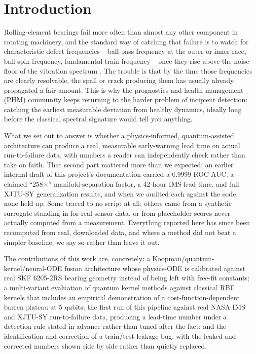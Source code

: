 \documentclass[3p,times,procedia]{elsarticle}
\begin{document}
\section{Introduction}

Rolling-element bearings fail more often than almost any other component in rotating machinery, and the standard way of catching that failure is to watch for characteristic defect frequencies -- ball-pass frequency at the outer or inner race, ball-spin frequency, fundamental train frequency -- once they rise above the noise floor of the vibration spectrum \cite{antoni2006}. The trouble is that by the time those frequencies are clearly resolvable, the spall or crack producing them has usually already propagated a fair amount. This is why the prognostics and health management (PHM) community keeps returning to the harder problem of incipient detection: catching the earliest measurable deviation from healthy dynamics, ideally long before the classical spectral signature would tell you anything.

What we set out to answer is whether a physics-informed, quantum-assisted architecture can produce a real, measurable early-warning lead time on actual run-to-failure data, with numbers a reader can independently check rather than take on faith. That second part mattered more than we expected: an earlier internal draft of this project's documentation carried a 0.9999 ROC-AUC, a claimed ``258$\times$'' manifold-separation factor, a 42-hour IMS lead time, and full XJTU-SY generalization results, and when we audited each against the code, none held up. Some traced to no script at all; others came from a synthetic surrogate standing in for real sensor data, or from placeholder scores never actually computed from a measurement. Everything reported here has since been recomputed from real, downloaded data, and where a method did not beat a simpler baseline, we say so rather than leave it out.

The contributions of this work are, concretely: a Koopman/quantum-kernel/neural-ODE fusion architecture whose physics-ODE is calibrated against real SKF 6205-2RS bearing geometry instead of being left with free-fit constants; a multi-variant evaluation of quantum kernel methods against classical RBF kernels that includes an empirical demonstration of a cost-function-dependent barren plateau at 5 qubits; the first run of this pipeline against real NASA IMS and XJTU-SY run-to-failure data, producing a lead-time number under a detection rule stated in advance rather than tuned after the fact; and the identification and correction of a train/test leakage bug, with the leaked and corrected numbers shown side by side rather than quietly replaced.
\end{document}

